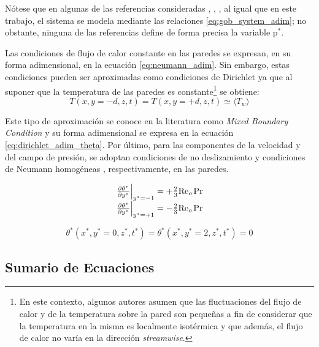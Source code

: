 Nótese que en algunas de las referencias consideradas \cite{guo2022direct}, \cite{zhou2024direct}, \cite{tao1960}, al igual que en este trabajo, el sistema se modela mediante las relaciones \ref{eq:gob_system_adim}; no obstante, ninguna de las referencias define de forma precisa la variable $\text{p}^*$.

Las condiciones de flujo de calor constante en las paredes se expresan, en su forma adimensional, en la ecuación \ref{eq:neumann_adim}. Sin embargo, estas condiciones pueden ser aproximadas como condiciones de Dirichlet ya que al suponer que la temperatura de las paredes es constante\footnote{En este contexto, algunos autores \cite{kasagi1992direct,tao1960} asumen que las fluctuaciones del flujo de calor y de la temperatura sobre la pared son pequeñas a fin de considerar que la temperatura en la misma es localmente isotérmica y que además, el flujo de calor no varía en la dirección \textit{streamwise}.} se obtiene:
$$T(x,y=-d,z,t) = T(x,y=+d,z,t) \simeq \langle T_w \rangle$$ 

Este tipo de aproximación se conoce en la literatura como \textit{Mixed Boundary Condition} \cite{straub2019influence} y su forma adimensional se expresa en la ecuación \ref{eq:dirichlet_adim_theta}. Por último, para las componentes de la velocidad y del campo de presión, se adoptan condiciones de no deslizamiento y condiciones de Neumann homogéneas \cite{bartholomew2020xcompact3d}, respectivamente, en las paredes. 

\begin{align}
\begin{array}{l}
    \left. \frac{\partial \theta^*}{\partial y^*} \right\vert_{y^*=-1} = + \frac{2}{3} \text{Re}_o \hspace{0.5mm} \text{Pr} \\
    \left. \frac{\partial \theta^*}{\partial y^*} \right\vert_{y^*=+1} = - \frac{2}{3} \text{Re}_o \hspace{0.5mm} \text{Pr} 
\end{array}
\label{eq:neumann_adim}
\end{align}

\begin{equation}
\theta^*(x^*,y^*=0,z^*,t^*) = \theta^*(x^*,y^*=2,z^*,t^*) = 0
\label{eq:dirichlet_adim_theta}
\end{equation}



\subsection{Sumario de Ecuaciones}

